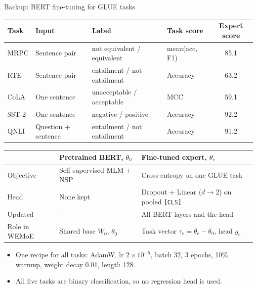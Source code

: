\documentclass[aspectratio=169,10pt]{beamer}
\begin{document}
\begin{frame}{Backup: BERT fine-tuning for GLUE tasks}
  \centering
  \scriptsize
  \begin{tabular}{l l l l c}
    \toprule
    Task & Input & Label & Task score & Expert score\\
    \midrule
    MRPC & Sentence pair & not equivalent / equivalent & mean(acc, F1) & 85.1\\
    RTE & Sentence pair & entailment / not entailment & Accuracy & 63.2\\
    CoLA & One sentence & unacceptable / acceptable & MCC & 59.1\\
    SST-2 & One sentence & negative / positive & Accuracy & 92.2\\
    QNLI & Question + sentence & entailment / not entailment & Accuracy & 91.2\\
    \bottomrule
  \end{tabular}
  \vfill
  \begin{tabular}{l l l}
    \toprule
    & Pretrained BERT, $\theta_0$ & Fine-tuned expert, $\theta_e$\\
    \midrule
    Objective & Self-supervised MLM + NSP & Cross-entropy on one GLUE task\\
    Head & None kept & Dropout + Linear ($d\to2$) on pooled \texttt{[CLS]}\\
    Updated & -- & All BERT layers and the head\\
    Role in WEMoE & Shared base $W_0$, $\theta_0$ & Task vector $\tau_e=\theta_e-\theta_0$, head $g_e$\\
    \bottomrule
  \end{tabular}
  \vfill
  \raggedright
  \begin{itemize}\footnotesize
    \item One recipe for all tasks: AdamW, lr $2\times10^{-5}$, batch 32, 3 epochs, 10\% warmup, weight decay 0.01, length 128.
    \item All five tasks are binary classification, so no regression head is used.
  \end{itemize}
\end{frame}
\end{document}
